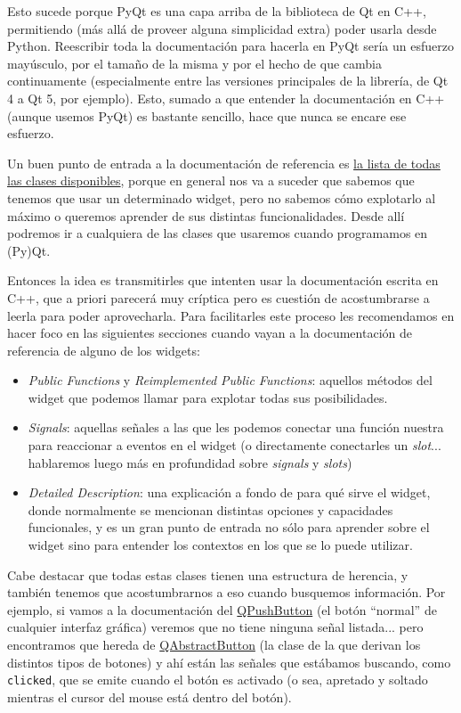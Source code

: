 Esto sucede porque PyQt es una capa arriba de la biblioteca de Qt en C++, permitiendo (más allá de proveer alguna simplicidad extra) poder usarla desde Python. Reescribir toda la documentación para hacerla en PyQt sería un esfuerzo mayúsculo, por el tamaño de la misma y por el hecho de que cambia continuamente (especialmente entre las versiones principales de la librería, de Qt 4 a Qt 5, por ejemplo). Esto, sumado a que entender la documentación en C++ (aunque usemos PyQt) es bastante sencillo, hace que nunca se encare ese esfuerzo.

Un buen punto de entrada a la documentación de referencia es \href{https://doc.qt.io/qt-6/classes.html}{la lista de todas las clases disponibles}, porque en general nos va a suceder que sabemos que tenemos que usar un determinado widget, pero no sabemos cómo explotarlo al máximo o queremos aprender de sus distintas funcionalidades. Desde allí podremos ir a cualquiera de las clases que usaremos cuando programamos en (Py)Qt.

Entonces la idea es transmitirles que intenten usar la documentación escrita en C++, que a priori parecerá muy críptica pero es cuestión de acostumbrarse a leerla para poder aprovecharla. Para facilitarles este proceso les recomendamos en hacer foco en las siguientes secciones cuando vayan a la documentación de referencia de alguno de los widgets:

\begin{itemize}
\item\textit{Public Functions} y \textit{Reimplemented Public Functions}: aquellos métodos del widget que podemos llamar para explotar todas sus posibilidades.
\item\textit{Signals}: aquellas señales a las que les podemos conectar una función nuestra para reaccionar a eventos en el widget (o directamente conectarles un \textit{slot}... hablaremos luego más en profundidad sobre \textit{signals} y \textit{slots})
\item\textit{Detailed Description}: una explicación a fondo de para qué sirve el widget, donde normalmente se mencionan distintas opciones y capacidades funcionales, y es un gran punto de entrada no sólo para aprender sobre el widget sino para entender los contextos en los que se lo puede utilizar.
\end{itemize}

Cabe destacar que todas estas clases tienen una estructura de herencia, y también tenemos que acostumbrarnos a eso cuando busquemos información. Por ejemplo, si vamos a la documentación del \href{https://doc.qt.io/qt-6/qpushbutton.html}{QPushButton} (el botón ``normal'' de cualquier interfaz gráfica) veremos que no tiene ninguna señal listada... pero encontramos que hereda de \href{https://doc.qt.io/qt-6/qabstractbutton.html}{QAbstractButton} (la clase de la que derivan los distintos tipos de botones) y ahí están las señales que estábamos buscando, como \texttt{clicked}, que se emite cuando el botón es activado (o sea, apretado y soltado mientras el cursor del mouse está dentro del botón).

